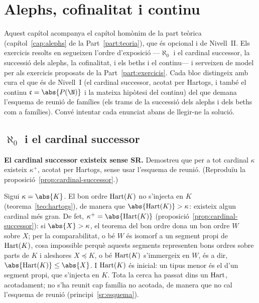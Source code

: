 \chapter{Alephs, cofinalitat i continu}\label{cap:practica-alephs}

Aquest capítol acompanya el capítol homònim de la part teòrica (capítol~\ref{cap:alephs} de la Part~\ref{part:teoria}), que és opcional i de Nivell~II. Els exercicis resolts en segueixen l'ordre d'exposició ---\(\aleph_0\) i el cardinal successor, la successió dels alephs, la cofinalitat, i els beths i el continu--- i serveixen de model per als exercicis proposats de la Part~\ref{part:exercicis}. Cada bloc distingeix amb cura el que és de Nivell~I (el cardinal successor, acotat per Hartogs, i també el continu \(\mathfrak c=\abs{P(\N)}\) i la mateixa hipòtesi del continu) del que demana l'esquema de reunió de famílies (els trams de la successió dels alephs i dels beths com a famílies). Convé intentar cada enunciat abans de llegir-ne la solució.

\section{\texorpdfstring{\(\aleph_0\)}{aleph 0} i el cardinal successor}\label{prac:aleph0-successor}

\begin{exercici}
\textbf{El cardinal successor existeix sense SR.} Demostreu que per a tot cardinal \(\kappa\) existeix \(\kappa^+\), acotat per Hartogs, sense usar l'esquema de reunió. (Reproduïu la proposició~\ref{prop:cardinal-successor}.)
\end{exercici}
\begin{solucio}
Sigui \(\kappa=\abs{K}\). El bon ordre \(\operatorname{Hart}(K)\) no s'injecta en \(K\) (teorema~\ref{teo:hartogs}), de manera que \(\abs{\Hart(K)}>\kappa\): existeix algun cardinal més gran. De fet, \(\kappa^+=\abs{\Hart(K)}\) (proposició~\ref{prop:cardinal-successor}): si \(\abs{X}>\kappa\), el teorema del bon ordre dona un bon ordre \(W\) sobre \(X\); per la comparabilitat, o bé \(W\) és isomorf a un segment propi de \(\operatorname{Hart}(K)\), cosa impossible perquè aquests segments representen bons ordres sobre parts de \(K\) i aleshores \(X\preceq K\), o bé \(\operatorname{Hart}(K)\) s'immergeix en \(W\), és a dir, \(\abs{\Hart(K)}\le\abs{X}\). I \(\operatorname{Hart}(K)\) és inicial: un tipus menor és el d'un segment propi, que s'injecta en \(K\). Tota la cerca ha passat dins un \(\operatorname{Hart}\), acotadament; no s'ha reunit cap família no acotada, de manera que no cal l'esquema de reunió (principi~\ref{sr:esquema}).
\end{solucio}

